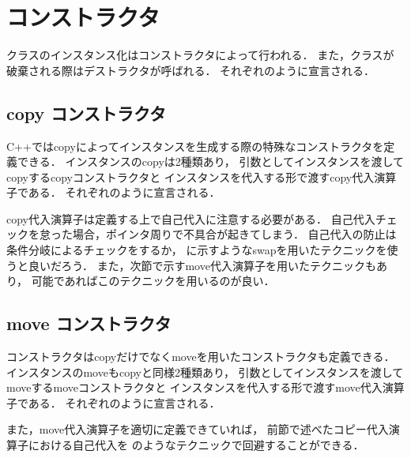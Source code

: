 \section{コンストラクタ}
クラスのインスタンス化はコンストラクタによって行われる．
また，クラスが破棄される際はデストラクタが呼ばれる．
それぞれのように宣言される．



\subsection{copy コンストラクタ}
C++ではcopyによってインスタンスを生成する際の特殊なコンストラクタを定義できる．
インスタンスのcopyは2種類あり，
引数としてインスタンスを渡してcopyするcopyコンストラクタと
インスタンスを代入する形で渡すcopy代入演算子である．
それぞれのように宣言される．


copy代入演算子は定義する上で自己代入に注意する必要がある．
自己代入チェックを怠った場合，ポインタ周りで不具合が起きてしまう．
自己代入の防止は条件分岐によるチェックをするか，
に示すようなswapを用いたテクニックを使うと良いだろう．
また，次節で示すmove代入演算子を用いたテクニックもあり，
可能であればこのテクニックを用いるのが良い．



\subsection{move コンストラクタ}
コンストラクタはcopyだけでなくmoveを用いたコンストラクタも定義できる．
インスタンスのmoveもcopyと同様2種類あり，
引数としてインスタンスを渡してmoveするmoveコンストラクタと
インスタンスを代入する形で渡すmove代入演算子である．
それぞれのように宣言される．


また，move代入演算子を適切に定義できていれば，
前節で述べたコピー代入演算子における自己代入を
のようなテクニックで回避することができる．


